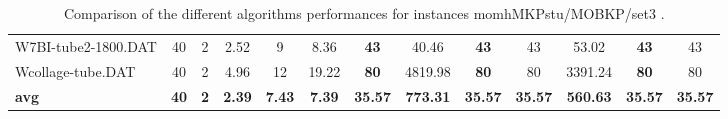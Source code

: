 \begin{table}[h]
{\begin{tabular}{lcccccccccccc}
W7BI-tube2-1800.DAT & 40 & 2 &  \textcolor{blue2}{2.52} & 9 & 8.36 &  \textbf{43} & 40.46 &  \textbf{43} & 43 & 53.02 &  \textbf{43} & 43 \\
Wcollage-tube.DAT & 40 & 2 &  \textcolor{blue2}{4.96} & 12 & 19.22 &  \textbf{80} & 4819.98 &  \textbf{80} & 80 & 3391.24 &  \textbf{80} & 80 \\
\cline{1-13} \textbf{avg} & \textbf{40} & \textbf{2} & \textbf{2.39} & \textbf{7.43} & \textbf{7.39} & \textbf{35.57} & \textbf{773.31} & \textbf{35.57} & \textbf{35.57} & \textbf{560.63} & \textbf{35.57} & \textbf{35.57} \\ \cline{1-13}
\bottomrule
\end{tabular}
}%
\caption{Comparison of the different algorithms performances for instances momhMKPstu/MOBKP/set3 .}
\label{tab:table_compare_momhMKPstu/MOBKP/set3 }
\end{table}
